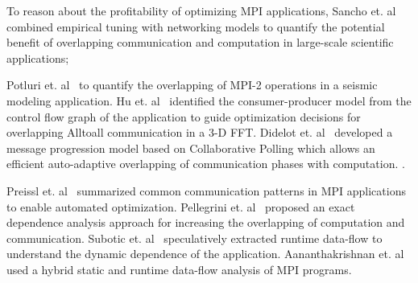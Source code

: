 To reason about the profitability of optimizing MPI applications,
 Sancho et. al~\cite{sancho:sc06} combined empirical tuning with networking models
    to quantify the potential benefit of overlapping communication and computation in large-scale scientific applications;

  Potluri et. al~\cite{potluri:ics10} 
  to quantify the overlapping of MPI-2 operations in a seismic modeling application.
  Hu et. al~\cite{hu:npc08,song:ppopp14} identified the consumer-producer model from the control flow graph of the application to guide optimization decisions  for overlapping Alltoall communication in a 3-D FFT.
Didelot et. al~\cite{didelot:imc14,didelot:eurompi12} developed a message progression model based on Collaborative Polling which allows an efficient auto-adaptive overlapping of communication phases with computation.
  .

Preissl et. al~\cite{preissl:tms10} summarized common communication patterns in MPI applications to enable automated optimization.
Pellegrini et. al~\cite{pellegrini:eurompi12} proposed an exact dependence analysis approach for increasing the overlapping of computation and communication.
Subotic et. al~\cite{subotic:hipeac08} speculatively extracted runtime data-flow to understand the dynamic dependence of the application.
Aananthakrishnan et. al~\cite{aananthakrishnan:ics13} used a hybrid  static and runtime data-flow analysis of MPI programs.

